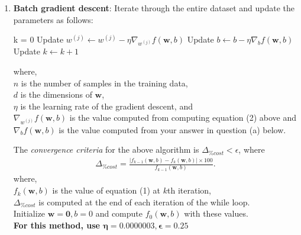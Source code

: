 \begin{enumerate}
\item  \textbf{Batch gradient descent}: Iterate through the entire dataset and update the parameters as follows:
\begin{algorithmic}
\STATE k = 0
\STATE Update $w^{(j)} \leftarrow w^{(j)} - \eta \nabla_{w^{(j)}} f(\mathbf{w},b)$
\ENDFOR
\STATE Update $b \leftarrow b - \eta \nabla_{b} f(\mathbf{w},b)$
\STATE Update $k \leftarrow k+1$
\ENDWHILE
\end{algorithmic}
where, \\
$n$ is the number of samples in the training data,\\
 $d$ is the dimensions of $\mathbf{w}$, \\
 $\eta$ is the learning rate of the gradient descent, and\\
 $\nabla_{w^{(j)}} f(\mathbf{w},b) $ is the value computed from computing equation (2) above and $\nabla_{b} f(\mathbf{w},b)$ is the value computed from your answer in question (a) below.
 
The {\em convergence criteria} for the above algorithm is $\Delta_{\% cost} < \epsilon$, where  
\begin{align}
\Delta_{\% cost } = \frac{|f_{k-1}(\mathbf{w}, b) - f_{k}(\mathbf{w}, b)|\times100}{f_{k-1}(\mathbf{w}, b)}.
\label{eq:stop}
\end{align}
where,\\
$f_{k}(\mathbf{w}, b)$ is the value of equation (1) at $k$th iteration, \\
$\Delta_{\% cost}$ is computed at the end of each iteration of the while loop. \\
Initialize $\mathbf{w = 0}, b = 0$ and compute $f_{0}(\mathbf{w}, b)$ with these values.\\
\textbf{For this method, use $\mathbf{\eta = 0.0000003, \epsilon = 0.25}$}


\end{enumerate}

